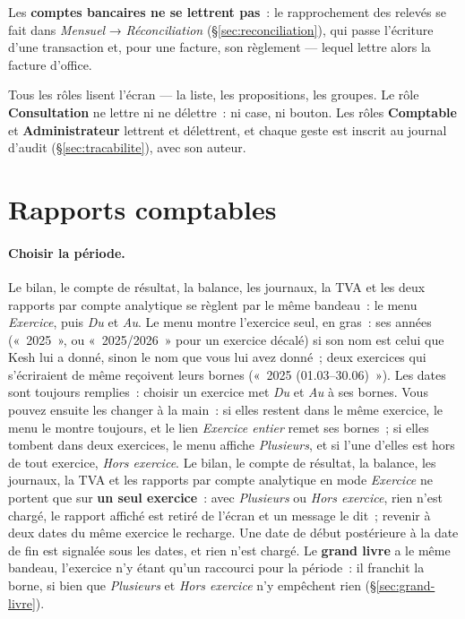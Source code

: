 \documentclass[a4paper,11pt,oneside]{article}
\begin{document}
Les \textbf{comptes bancaires ne se lettrent pas}~: le rapprochement des relevés se fait dans
\emph{Mensuel} → \emph{Réconciliation} (\S\ref{sec:reconciliation}), qui passe l'écriture d'une
transaction et, pour une facture, son règlement --- lequel lettre alors la facture d'office.

Tous les rôles lisent l'écran --- la liste, les propositions, les groupes. Le rôle
\textbf{Consultation} ne lettre ni ne délettre~: ni case, ni bouton. Les rôles
\textbf{Comptable} et \textbf{Administrateur} lettrent et délettrent, et chaque geste est inscrit
au journal d'audit (\S\ref{sec:tracabilite}), avec son auteur.

\section{Rapports comptables}

\paragraph{Choisir la période.} Le bilan, le compte de résultat, la balance, les journaux, la TVA et les deux
rapports par compte analytique se règlent par le même bandeau~: le menu \emph{Exercice}, puis \emph{Du} et
\emph{Au}. Le menu montre l'exercice seul, en gras~: ses années («~2025~», ou «~2025/2026~» pour un exercice
décalé) si son nom est celui que Kesh lui a donné, sinon le nom que vous lui avez donné~; deux exercices qui
s'écriraient de même reçoivent leurs bornes («~2025 (01.03--30.06)~»). Les dates sont toujours remplies~:
choisir un exercice met \emph{Du} et \emph{Au} à ses bornes. Vous pouvez ensuite les changer à la main~: si
elles restent dans le même exercice, le menu le montre toujours, et le lien \emph{Exercice entier} remet ses
bornes~; si elles tombent dans deux exercices, le menu affiche \emph{Plusieurs}, et si l'une d'elles est hors de
tout exercice, \emph{Hors exercice}. Le bilan, le compte de résultat, la balance, les journaux, la TVA et les
rapports par compte analytique en mode \emph{Exercice} ne portent que sur \textbf{un seul exercice}~: avec
\emph{Plusieurs} ou \emph{Hors exercice}, rien n'est chargé, le rapport affiché est retiré de l'écran et un
message le dit~; revenir à deux dates du même exercice le recharge. Une date de début postérieure à la date de
fin est signalée sous les dates, et rien n'est chargé. Le \textbf{grand livre} a le même bandeau, l'exercice
n'y étant qu'un raccourci pour la période~: il franchit la borne, si bien que \emph{Plusieurs} et \emph{Hors
exercice} n'y empêchent rien (\S\ref{sec:grand-livre}).
\end{document}
